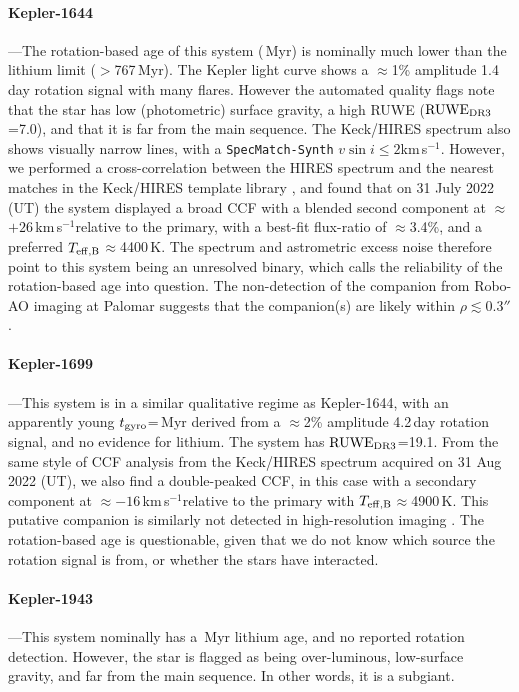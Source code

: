 \documentclass[11pt,twocolumn,tighten]{aastex63}
\newcommand{\kms}{{km\,s$^{-1}$}}
\begin{document}
\paragraph{Kepler-1644}---The rotation-based age of this system (\kepsixteenfourfour\,Myr) is nominally
much lower than the lithium limit ($>$767\,Myr).
The Kepler light curve shows a $\approx$1\% amplitude 1.4\,day rotation signal with many flares.
However the automated quality flags note that the star has low (photometric) surface gravity, a high RUWE (${\rm RUWE}_{\rm DR3}$=7.0),
and that it is far from the main sequence.
The Keck/HIRES spectrum also shows visually narrow lines, with a
 \texttt{SpecMatch-Synth} $v \sin i \leq 2$\kms. 
However, we performed a cross-correlation between the HIRES spectrum and 
the nearest matches in the Keck/HIRES template library \citep{2015AJ....149...18K}, and found that on 31 July 2022 (UT)
the system displayed
a broad CCF with a blended second component at $\approx$$+26$\,\kms relative to
the primary, with a best-fit flux-ratio of $\approx$3.4\%, and a preferred $T_{\rm eff,B}$$\approx$4400\,K.
The spectrum and astrometric excess noise therefore point to this system being an unresolved
binary, which calls the
reliability of the rotation-based age into question.
The non-detection of the companion
from Robo-AO imaging at Palomar \citep{2017AJ....153...66Z} suggests that the companion(s)
are likely within $\rho$$\lesssim$0.3$''$.



\paragraph{Kepler-1699}---This system is in a similar qualitative regime as Kepler-1644, with an
apparently young $t_{\rm gyro}$=\kepsixteenninenine\,Myr derived from a $\approx$2\% amplitude
4.2\,day rotation signal, and no evidence for lithium.
The system has ${\rm RUWE}_{\rm DR3}$=19.1.
From the same style of CCF analysis from the Keck/HIRES spectrum acquired on
31 Aug 2022 (UT), we also find a double-peaked CCF, in this case with a secondary
component at $\approx$$-16$\,\kms relative to
the primary with $T_{\rm eff,B}$$\approx$4900\,K.
This putative companion is similarly not detected in high-resolution imaging
 \citep{2017AJ....153...66Z}.
 The rotation-based age is questionable, given that we do not know which source the
 rotation signal is from, or whether the stars have interacted.

\paragraph{Kepler-1943}---This system nominally has a \kepnineteenfourthree\,Myr
lithium age, and no reported rotation detection.
However, the star is flagged as being over-luminous, low-surface gravity,
and far from the main sequence.
In other words, it is a subgiant.
\end{document}

